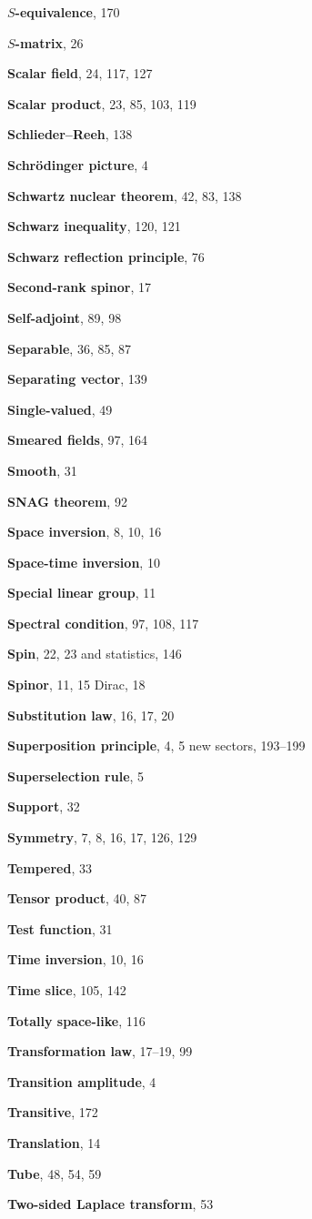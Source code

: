\begin{theindex}
\indexspace
\item \textbf{$S$-equivalence}, 170
\item \textbf{$S$-matrix}, 26
\item \textbf{Scalar field}, 24, 117, 127
\item \textbf{Scalar product}, 23, 85, 103, 119
\item \textbf{Schlieder--Reeh}, 138
\item \textbf{Schr\"odinger picture}, 4
\item \textbf{Schwartz nuclear theorem}, 42, 83, 138
\item \textbf{Schwarz inequality}, 120, 121
\item \textbf{Schwarz reflection principle}, 76
\item \textbf{Second-rank spinor}, 17
\item \textbf{Self-adjoint}, 89, 98
\item \textbf{Separable}, 36, 85, 87
\item \textbf{Separating vector}, 139
\item \textbf{Single-valued}, 49
\item \textbf{Smeared fields}, 97, 164

\item \textbf{Smooth}, 31
\item \textbf{SNAG theorem}, 92
\item \textbf{Space inversion}, 8, 10, 16
\item \textbf{Space-time inversion}, 10
\item \textbf{Special linear group}, 11
\item \textbf{Spectral condition}, 97, 108, 117
\item \textbf{Spin}, 22, 23
\subitem and statistics, 146
\item \textbf{Spinor}, 11, 15
\subitem Dirac, 18
\item \textbf{Substitution law}, 16, 17, 20
\item \textbf{Superposition principle}, 4, 5
\subitem new sectors, 193--199
\item \textbf{Superselection rule}, 5
\item \textbf{Support}, 32
\item \textbf{Symmetry}, 7, 8, 16, 17, 126, 129

\indexspace
\item \textbf{Tempered}, 33
\item \textbf{Tensor product}, 40, 87
\item \textbf{Test function}, 31
\item \textbf{Time inversion}, 10, 16
\item \textbf{Time slice}, 105, 142
\item \textbf{Totally space-like}, 116
\item \textbf{Transformation law}, 17--19, 99
\item \textbf{Transition amplitude}, 4
\item \textbf{Transitive}, 172
\item \textbf{Translation}, 14
\item \textbf{Tube}, 48, 54, 59
\item \textbf{Two-sided Laplace transform}, 53


\end{theindex}
